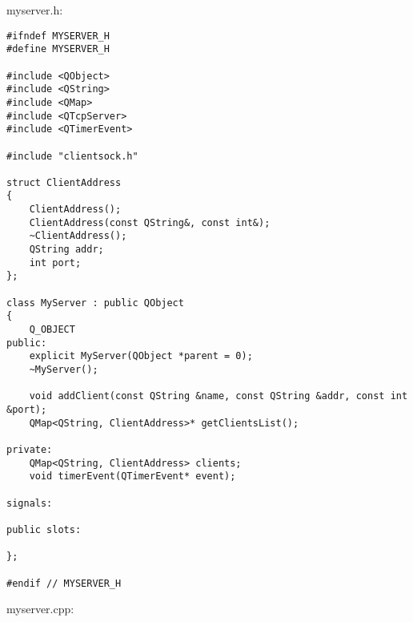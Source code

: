 myserver.h:

\begin{lstlisting}
#ifndef MYSERVER_H
#define MYSERVER_H

#include <QObject>
#include <QString>
#include <QMap>
#include <QTcpServer>
#include <QTimerEvent>

#include "clientsock.h"

struct ClientAddress
{
    ClientAddress();
    ClientAddress(const QString&, const int&);
    ~ClientAddress();
    QString addr;
    int port;
};

class MyServer : public QObject
{
    Q_OBJECT
public:
    explicit MyServer(QObject *parent = 0);
    ~MyServer();

    void addClient(const QString &name, const QString &addr, const int &port);
    QMap<QString, ClientAddress>* getClientsList();

private:
    QMap<QString, ClientAddress> clients;
    void timerEvent(QTimerEvent* event);

signals:

public slots:

};

#endif // MYSERVER_H
\end{lstlisting}

myserver.cpp:

